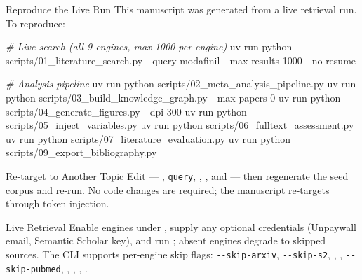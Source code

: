 \documentclass[
  ignorenonframetext,
]{beamer}
\newenvironment{Shaded}{}{}
\newcommand{\AttributeTok}[1]{\textcolor[rgb]{0.49,0.56,0.16}{#1}}
\newcommand{\CommentTok}[1]{\textcolor[rgb]{0.38,0.63,0.69}{\textit{#1}}}
\newcommand{\ExtensionTok}[1]{#1}
\newcommand{\NormalTok}[1]{#1}
\begin{document}
\begin{frame}{Reproduce the Live Run}
\label{reproduce-the-live-run}
This manuscript was generated from a live retrieval run. To reproduce:

\begin{Shaded}
\begin{Highlighting}[]
\CommentTok{\# Live search (all 9 engines, max 1000 per engine)}
\ExtensionTok{uv}\NormalTok{ run python scripts/01\_literature\_search.py }\AttributeTok{{-}{-}query}\NormalTok{ modafinil }\AttributeTok{{-}{-}max{-}results}\NormalTok{ 1000 }\AttributeTok{{-}{-}no{-}resume}

\CommentTok{\# Analysis pipeline}
\ExtensionTok{uv}\NormalTok{ run python scripts/02\_meta\_analysis\_pipeline.py}
\ExtensionTok{uv}\NormalTok{ run python scripts/03\_build\_knowledge\_graph.py }\AttributeTok{{-}{-}max{-}papers}\NormalTok{ 0}
\ExtensionTok{uv}\NormalTok{ run python scripts/04\_generate\_figures.py }\AttributeTok{{-}{-}dpi}\NormalTok{ 300}
\ExtensionTok{uv}\NormalTok{ run python scripts/05\_inject\_variables.py}
\ExtensionTok{uv}\NormalTok{ run python scripts/06\_fulltext\_assessment.py}
\ExtensionTok{uv}\NormalTok{ run python scripts/07\_literature\_evaluation.py}
\ExtensionTok{uv}\NormalTok{ run python scripts/09\_export\_bibliography.py}
\end{Highlighting}
\end{Shaded}
\end{frame}

\begin{frame}{Re-target to Another Topic}
\label{re-target-to-another-topic}
Edit  ---
, \texttt{query},
, , and
 --- then regenerate the seed corpus and
re-run. No code changes are required; the manuscript re-targets through
token injection.
\end{frame}

\begin{frame}{Live Retrieval}
\label{live-retrieval}
Enable engines under , supply any
optional credentials (Unpaywall email, Semantic Scholar key), and run
; absent engines degrade to
skipped sources. The CLI supports per-engine skip flags:
\texttt{-\/-skip-arxiv}, \texttt{-\/-skip-s2},
, ,
\texttt{-\/-skip-pubmed}, ,
, ,
.
\end{frame}
\end{document}
